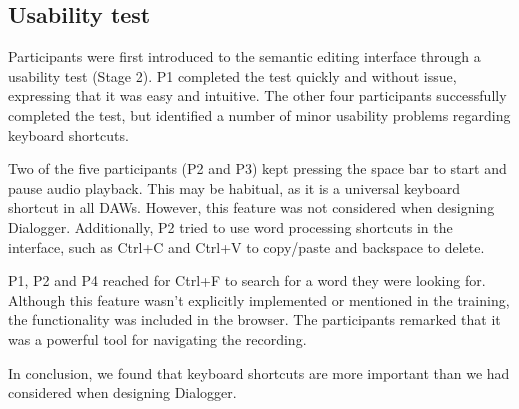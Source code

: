 

\subsection{Usability test}
Participants were first introduced to the semantic editing interface through a usability test (Stage 2). P1 completed
the test quickly and without issue, expressing that it was easy and intuitive. The other four participants successfully
completed the test, but identified a number of minor usability problems regarding keyboard shortcuts.

Two of the five participants (P2 and P3) kept pressing the space bar to start and pause audio playback. This may be
habitual, as it is a universal keyboard shortcut in all DAWs. However, this feature was not considered when designing
Dialogger.  Additionally, P2 tried to use word processing shortcuts in the interface, such as Ctrl+C and Ctrl+V to
copy/paste and backspace to delete.

P1, P2 and P4 reached for Ctrl+F to search for a word they were looking for. Although this feature wasn't explicitly
implemented or mentioned in the training, the functionality was included in the browser. The participants remarked that
it was a powerful tool for navigating the recording.

In conclusion, we found that keyboard shortcuts are more important than we had considered when designing Dialogger.


